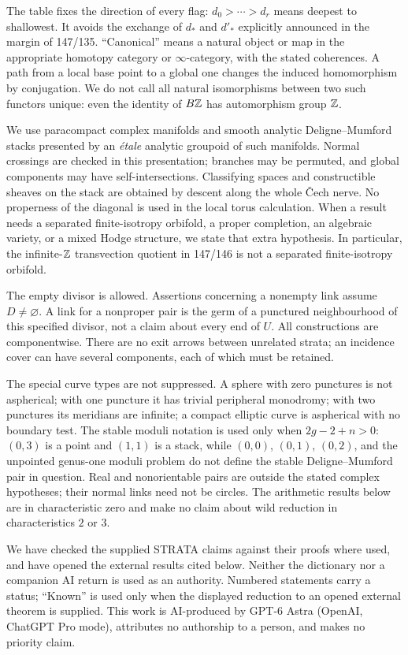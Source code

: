 The table fixes the direction of every flag: $d_0>\cdots>d_r$ means
deepest to shallowest.  It avoids the exchange of $d_*$ and $d'_*$ explicitly
announced in the margin of 147/135.  ``Canonical'' means a natural object or
map in the appropriate homotopy category or $\infty$-category, with the stated
coherences.  A path from a local base point to a global one changes the induced
homomorphism by conjugation.  We do not call all natural isomorphisms between
two such functors unique: even the identity of $B\mathbb Z$ has automorphism group
$\mathbb Z$.

We use paracompact complex manifolds and smooth analytic Deligne--Mumford
stacks presented by an \emph{étale} analytic groupoid of such manifolds.
Normal crossings are checked in this presentation; branches may be permuted,
and global components may have self-intersections.  Classifying spaces and
constructible sheaves on the stack are obtained by descent along the whole
Čech nerve.  No properness of the diagonal is used in the local torus
calculation.  When a result needs a separated finite-isotropy orbifold, a
proper completion, an algebraic variety, or a mixed Hodge structure, we state
that extra hypothesis.  In particular, the infinite-$\mathbb Z$ transvection quotient
in 147/146 is not a separated finite-isotropy orbifold.

The empty divisor is allowed.  Assertions concerning a nonempty link assume
$D\ne\varnothing$.  A link for a nonproper pair is the germ of a punctured
neighbourhood of this specified divisor, not a claim about every end of $U$.
All constructions are componentwise.  There are no exit arrows between
unrelated strata; an incidence cover can have several components, each of
which must be retained.

The special curve types are not suppressed.  A sphere with zero punctures
is not aspherical; with one puncture it has trivial peripheral monodromy;
with two punctures its meridians are infinite; a compact elliptic curve is
aspherical with no boundary test.  The stable moduli notation is used only
when $2g-2+n>0$: $(0,3)$ is a point and $(1,1)$ is a stack, while $(0,0)$,
$(0,1)$, $(0,2)$, and the unpointed genus-one moduli problem do not define the
stable Deligne--Mumford pair in question.  Real and nonorientable pairs are
outside the stated complex hypotheses; their normal links need not be
circles.  The arithmetic results below are in characteristic zero and make
no claim about wild reduction in characteristics $2$ or $3$.

We have checked the supplied STRATA claims against their proofs where used,
and have opened the external results cited below.  Neither the dictionary
nor a companion AI return is used as an authority.  Numbered statements carry
a status; ``Known'' is used only when the displayed reduction to an opened
external theorem is supplied.  This work is AI-produced by GPT-6 Astra
(OpenAI, ChatGPT Pro mode), attributes no authorship to a person, and makes
no priority claim.
